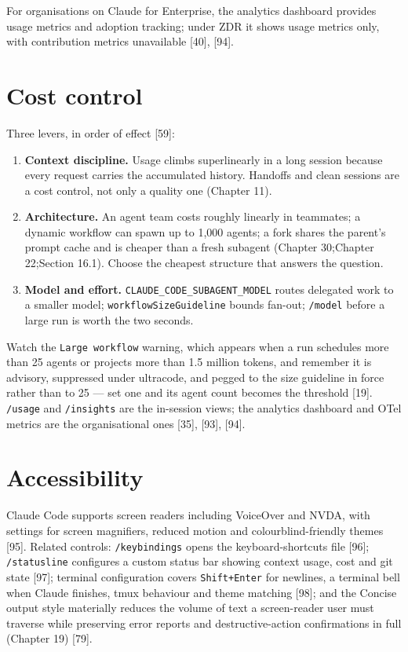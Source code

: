 \documentclass[11pt,a4paper,twoside,openany]{book}
\begin{document}
For organisations on Claude for Enterprise, the analytics dashboard provides usage metrics and adoption tracking; under ZDR it shows usage metrics only, with contribution metrics unavailable [40], [94].


\FloatBarrier
\setcounter{section}{1}
\section{Cost control}

Three levers, in order of effect [59]:


\begin{enumerate}
\item \textbf{Context discipline.} Usage climbs superlinearly in a long session because every request carries the accumulated history. Handoffs and clean sessions are a cost control, not only a quality one (Chapter 11).
\item \textbf{Architecture.} An agent team costs roughly linearly in teammates; a dynamic workflow can spawn up to 1,000 agents; a fork shares the parent's prompt cache and is cheaper than a fresh subagent (Chapter 30;Chapter 22;Section 16.1). Choose the cheapest structure that answers the question.
\item \textbf{Model and effort.} \texttt{CLAUDE\_\allowbreak{}CODE\_\allowbreak{}SUBAGENT\_\allowbreak{}MODEL} routes delegated work to a smaller model; \texttt{workflow\allowbreak{}Size\allowbreak{}Guideline} bounds fan-out; \texttt{/\allowbreak{}model} before a large run is worth the two seconds.
\end{enumerate}

Watch the \texttt{Large workf\allowbreak{}low} warning, which appears when a run schedules more than 25 agents or projects more than 1.5 million tokens, and remember it is advisory, suppressed under ultracode, and pegged to the size guideline in force rather than to 25 — set one and its agent count becomes the threshold [19]. \texttt{/\allowbreak{}usage} and \texttt{/\allowbreak{}insights} are the in-session views; the analytics dashboard and OTel metrics are the organisational ones [35], [93], [94].


\FloatBarrier
\setcounter{section}{2}
\section{Accessibility}

Claude Code supports screen readers including VoiceOver and NVDA, with settings for screen magnifiers, reduced motion and colourblind-friendly themes [95]. Related controls: \texttt{/\allowbreak{}keybindings} opens the keyboard-shortcuts file [96]; \texttt{/\allowbreak{}statusline} configures a custom status bar showing context usage, cost and git state [97]; terminal configuration covers \texttt{Shift+Enter} for newlines, a terminal bell when Claude finishes, tmux behaviour and theme matching [98]; and the Concise output style materially reduces the volume of text a screen-reader user must traverse while preserving error reports and destructive-action confirmations in full (Chapter 19) [79].
\end{document}
